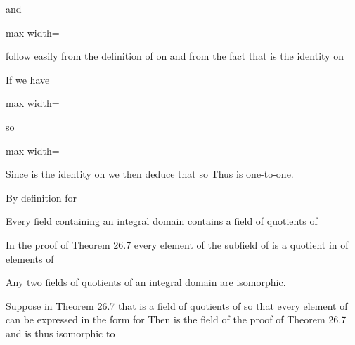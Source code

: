\documentclass[11pt,oneside]{article}
\begin{document}
\begin{BookBody}
\noindent and

\begin{center}\begin{adjustbox}{max width=\linewidth}\end{adjustbox}\end{center}

\noindent follow easily from the definition of \BookInline{\psi } on  and from the fact that \BookInline{\psi } is the identity on 

If  we have

\begin{center}\begin{adjustbox}{max width=\linewidth}\end{adjustbox}\end{center}

\noindent so

\begin{center}\begin{adjustbox}{max width=\linewidth}\end{adjustbox}\end{center}

\noindent Since \BookInline{\psi } is the identity on  we then deduce that  so  Thus \BookInline{\psi } is one-to-one.

By definition for  \BookEnd{\blacklozenge}

 Every field  containing an integral domain  contains a field of quotients of 

 In the proof of Theorem 26.7 every element of the subfield \BookInline{\psi [F]} of  is a quotient in  of elements of \BookEnd{\blacklozenge}

 Any two fields of quotients of an integral domain  are isomorphic.

 Suppose in Theorem 26.7 that  is a field of quotients of  so that every element  of  can be expressed in the form  for  Then  is the field \BookInline{\psi [F]} of the proof of Theorem 26.7 and is thus isomorphic to \BookEnd{\blacklozenge}

\end{BookBody}
\end{document}
